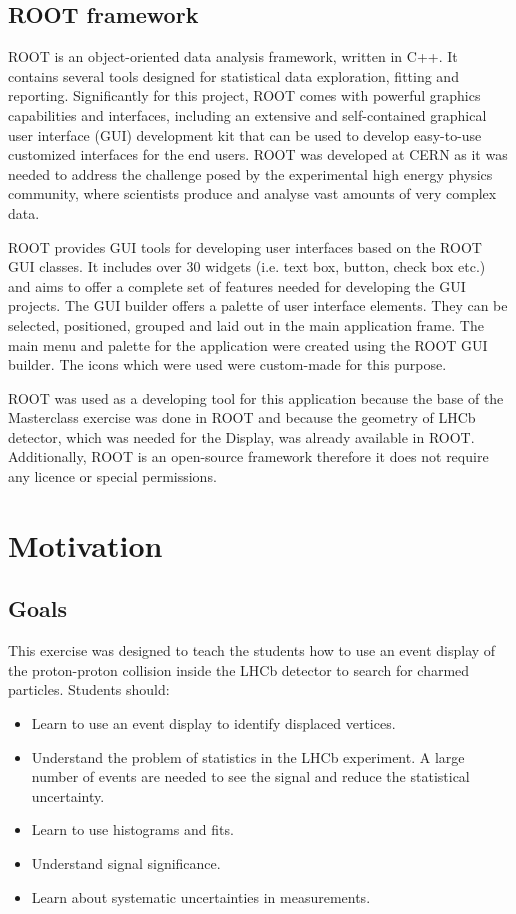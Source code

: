 \documentclass[3p,times,twocolumn]{elsarticle}
\begin{document}
\subsection{ROOT framework}
ROOT is an object-oriented data analysis framework, written in C++. It contains several tools designed for statistical data exploration, fitting and reporting. Significantly for this project, ROOT comes with powerful graphics capabilities and interfaces, including an extensive and self-contained graphical user interface (GUI) development kit that can be used to develop easy-to-use customized interfaces for the end users. ROOT was developed at CERN as it was needed to address the challenge posed by the experimental high energy physics community, where scientists produce and analyse vast amounts of very complex data. \par
ROOT provides GUI tools for developing user interfaces based on the ROOT GUI classes. It includes over 30 widgets (i.e. text box, button, check box etc.) and aims to offer a complete set of features needed for developing the GUI projects. The GUI builder offers a palette of user interface elements. They can be selected, positioned, grouped and laid out in the main application frame. The main menu and palette for the application were created using the ROOT GUI builder. The icons which were used were custom-made for this purpose.\par
ROOT was used as a developing tool for this application because the base of the Masterclass exercise was done in ROOT and because the geometry of LHCb detector, which was needed for the Display, was already available in ROOT. Additionally, ROOT is an open-source framework therefore it does not require any licence or special permissions. 

\section{Motivation}
\subsection{Goals}
This exercise was designed to teach the students how to use an event display of the proton-proton collision inside the LHCb detector to search for charmed particles.
Students should:
\begin{itemize}
\setlength{\itemsep}{0pt}
	\item Learn to use an event display to identify displaced vertices.
	\item Understand the problem of statistics in the LHCb experiment. A large number of events are needed to see the signal and reduce the statistical uncertainty.
	\item Learn to use histograms and fits.
	\item Understand signal significance.
	\item Learn about systematic uncertainties in measurements. 
\end{itemize}
\end{document}
